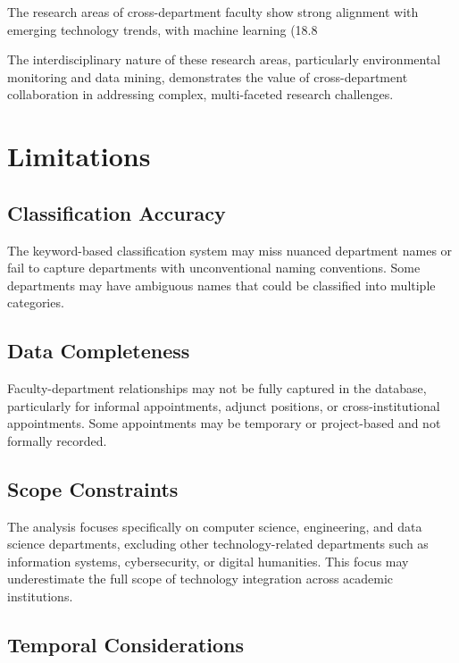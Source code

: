 \documentclass[12pt]{article}
\begin{document}
The research areas of cross-department faculty show strong alignment with emerging technology trends, with machine learning (18.8%

The interdisciplinary nature of these research areas, particularly environmental monitoring and data mining, demonstrates the value of cross-department collaboration in addressing complex, multi-faceted research challenges.

\section{Limitations}

\subsection{Classification Accuracy}

The keyword-based classification system may miss nuanced department names or fail to capture departments with unconventional naming conventions. Some departments may have ambiguous names that could be classified into multiple categories.

\subsection{Data Completeness}

Faculty-department relationships may not be fully captured in the database, particularly for informal appointments, adjunct positions, or cross-institutional appointments. Some appointments may be temporary or project-based and not formally recorded.

\subsection{Scope Constraints}

The analysis focuses specifically on computer science, engineering, and data science departments, excluding other technology-related departments such as information systems, cybersecurity, or digital humanities. This focus may underestimate the full scope of technology integration across academic institutions.

\subsection{Temporal Considerations}
\end{document}
